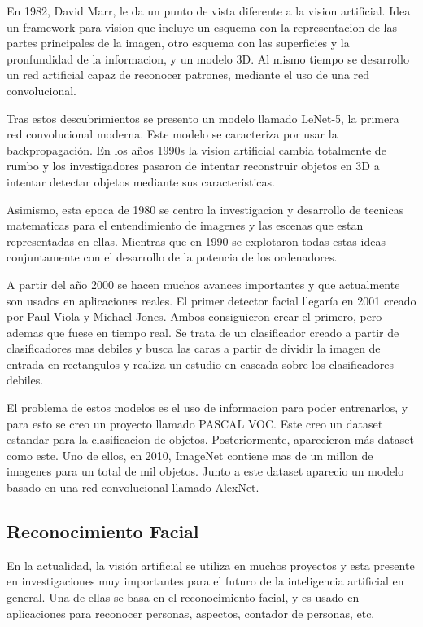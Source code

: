 En 1982, David Marr, le da un punto de vista diferente a la vision artificial. Idea un framework para vision que incluye un esquema con la representacion de las partes principales de la imagen, otro esquema con las superficies y la pronfundidad de la informacion, y un modelo 3D. Al mismo tiempo se desarrollo un red artificial capaz de reconocer patrones, mediante el uso de una red convolucional.

Tras estos descubrimientos se presento un modelo llamado LeNet-5, la primera red convolucional moderna. Este modelo se caracteriza por usar la backpropagación. En los años 1990s la vision artificial cambia totalmente de rumbo y los investigadores pasaron de intentar reconstruir objetos en 3D a intentar detectar objetos mediante sus caracteristicas.

Asimismo, esta epoca de 1980 se centro la investigacion y desarrollo de tecnicas matematicas para el entendimiento de imagenes y las escenas que estan representadas en ellas. Mientras que en 1990 se explotaron todas estas ideas conjuntamente con el desarrollo de la potencia de los ordenadores.

A partir del año 2000 se hacen muchos avances importantes y que actualmente son usados en aplicaciones reales. El primer detector facial llegaría en 2001 creado por Paul Viola y Michael Jones. Ambos consiguieron crear el primero, pero ademas que fuese en tiempo real. Se trata de un clasificador creado a partir de clasificadores mas debiles y busca las caras a partir de dividir la imagen de entrada en rectangulos y realiza un estudio en cascada sobre los clasificadores debiles.

El problema de estos modelos es el uso de informacion para poder entrenarlos, y para esto se creo un proyecto llamado PASCAL VOC. Este creo un dataset estandar para la clasificacion de objetos. Posteriormente, aparecieron más dataset como este. Uno de ellos, en 2010, ImageNet contiene mas de un millon de imagenes para un total de mil objetos. Junto a este dataset aparecio un modelo basado en una red convolucional llamado AlexNet.

\subsection{Reconocimiento Facial}
En la actualidad, la visión artificial se utiliza en muchos proyectos y esta presente en investigaciones muy importantes para el futuro de la inteligencia artificial en general. Una de ellas se basa en el reconocimiento facial, y es usado en aplicaciones para reconocer personas, aspectos, contador de personas, etc. 



